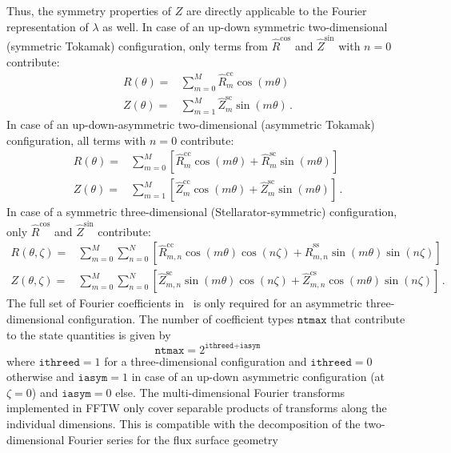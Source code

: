 Thus, the symmetry properties of $Z$ are directly applicable
to the Fourier representation of $\lambda$ as well.
In case of an up-down symmetric two-dimensional (symmetric Tokamak) configuration,
only terms from $\hat{R}^\mathrm{cos}$ and $\hat{Z}^\mathrm{sin}$ with $n=0$ contribute:
\begin{align}
  R(\theta) =& \sum_{m=0}^M \hat{R}^\mathrm{cc}_m \cos(m \theta) \\
  Z(\theta) =& \sum_{m=1}^M \hat{Z}^\mathrm{sc}_m \sin(m \theta) \, .
\end{align}
In case of an up-down-asymmetric two-dimensional (asymmetric Tokamak) configuration,
all terms with $n=0$ contribute:
\begin{align}
  R(\theta) =& \sum_{m=0}^M \left[ \hat{R}^\mathrm{cc}_m \cos(m \theta) + \hat{R}^\mathrm{sc}_m \sin(m \theta) \right] \\
  Z(\theta) =& \sum_{m=1}^M \left[ \hat{Z}^\mathrm{cc}_m \cos(m \theta) + \hat{Z}^\mathrm{sc}_m \sin(m \theta) \right] \, .
\end{align}
In case of a symmetric three-dimensional (Stellarator-symmetric) configuration,
only $\hat{R}^\mathrm{cos}$ and $\hat{Z}^\mathrm{sin}$ contribute:
\begin{align}
  R(\theta, \zeta) =& \sum_{m=0}^M \sum_{n=0}^N \left[  \hat{R}^\mathrm{cc}_{m,n} \cos(m \theta) \cos(n \zeta)
                                                      + \hat{R}^\mathrm{ss}_{m,n} \sin(m \theta) \sin(n \zeta) \right] \\
  Z(\theta, \zeta) =& \sum_{m=0}^M \sum_{n=0}^N \left[  \hat{Z}^\mathrm{sc}_{m,n} \sin(m \theta) \cos(n \zeta)
                                                      + \hat{Z}^\mathrm{cs}_{m,n} \cos(m \theta) \sin(n \zeta) \right] \, .
\end{align}
The full set of Fourier coefficients in~ is only required
for an asymmetric three-dimensional configuration.
The number of coefficient types $\texttt{ntmax}$ that contribute to the state quantities is given by
\begin{equation}
  \texttt{ntmax} = 2^{\texttt{ithreed} + \texttt{iasym}}
\end{equation}
where $\texttt{ithreed}=1$ for a three-dimensional configuration and $\texttt{ithreed}=0$ otherwise
and $\texttt{iasym}=1$ in case of an up-down asymmetric configuration (at $\zeta=0$) and $\texttt{iasym}=0$ else.
The multi-dimensional Fourier transforms implemented in FFTW only cover separable products of transforms along the individual dimensions.
This is compatible with the decomposition of the two-dimensional Fourier series for the flux surface geometry
